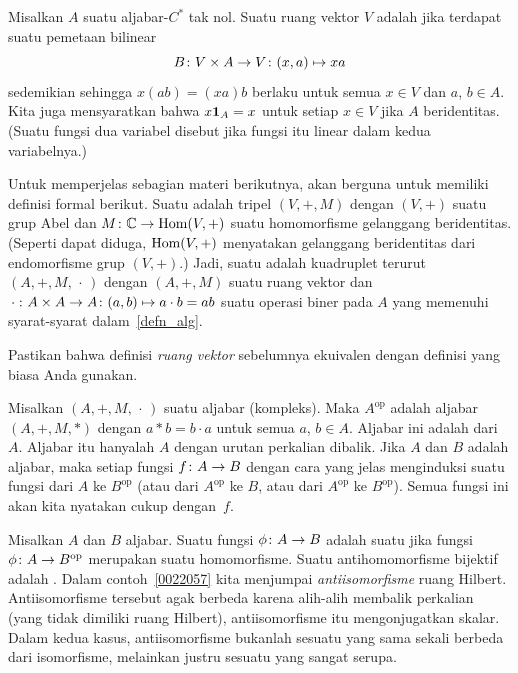 \begin{defn}\label{0038017} Misalkan $A$ suatu aljabar-$C^*$ tak nol. Suatu ruang vektor $V$ adalah
jika terdapat suatu pemetaan bilinear
  \[ B\colon V \times A \rightarrow V\colon (x,a) \mapsto xa \]
sedemikian sehingga $x(ab) = (xa)b$ berlaku untuk semua $x \in V$ dan $a$, $b \in A$. Kita juga mensyaratkan
bahwa $x \mathbf{1}_A = x$ untuk setiap $x \in V$ jika $A$ beridentitas. (Suatu fungsi dua variabel
disebut  jika fungsi itu linear dalam kedua variabelnya.)
\end{defn}

\begin{defn}\label{0038021} Untuk memperjelas sebagian materi berikutnya, akan
berguna untuk memiliki definisi formal berikut. Suatu
 adalah tripel $(V,+,M)$ dengan $(V,+)$ suatu grup Abel dan
$M\colon \mathbb{C} \rightarrow \operatorname{Hom}(V,+)$ suatu homomorfisme gelanggang beridentitas. (Seperti dapat diduga,
$\operatorname{Hom}(V,+)$ menyatakan gelanggang beridentitas dari endomorfisme grup $(V,+)$.) Jadi, suatu
 adalah kuadruplet terurut $(A,+,M,\,\cdot\,)$ dengan $(A,+,M)$ suatu ruang
vektor dan $\,\cdot\,\colon A \times A \rightarrow A \colon (a,b) \mapsto a \cdot b = ab$ suatu
operasi biner pada $A$ yang memenuhi syarat-syarat dalam~\ref{defn_alg}.
\end{defn}

\begin{exer} Pastikan bahwa definisi \emph{ruang vektor} sebelumnya ekuivalen
dengan definisi yang biasa Anda gunakan.
\end{exer}

\begin{defn} Misalkan $(A,+,M,\,\cdot\,)$ suatu aljabar (kompleks). Maka $A^{\textrm{op}}$
adalah aljabar $(A,+,M,*)$ dengan $a*b = b\cdot a$ untuk semua $a$, $b \in A$. Aljabar ini adalah
 dari~$A$. Aljabar itu hanyalah $A$ dengan urutan perkalian dibalik.
Jika $A$ dan $B$ adalah aljabar, maka setiap fungsi $f \colon A \rightarrow B$ dengan cara yang jelas menginduksi
suatu fungsi dari $A$ ke $B^{\textrm{op}}$ (atau dari $A^{\textrm{op}}$ ke $B$,
atau dari $A^{\textrm{op}}$ ke $B^{\textrm{op}}$). Semua fungsi ini akan kita nyatakan
cukup dengan~$f$.
\end{defn}

\begin{defn}\label{0038027} Misalkan $A$ dan $B$ aljabar. Suatu fungsi
$\phi\colon A \rightarrow B$ adalah suatu
 jika fungsi $\phi\colon A \rightarrow B^{\textrm{op}}$ merupakan suatu homomorfisme.
Suatu antihomomorfisme bijektif adalah
. Dalam contoh~\ref{0022057} kita menjumpai \emph{antiisomorfisme}
ruang Hilbert. Antiisomorfisme tersebut agak berbeda karena alih-alih membalik perkalian
(yang tidak dimiliki ruang Hilbert), antiisomorfisme itu mengonjugatkan skalar. Dalam kedua kasus,
antiisomorfisme bukanlah sesuatu yang sama sekali berbeda dari isomorfisme, melainkan justru
sesuatu yang sangat serupa.
\end{defn}

